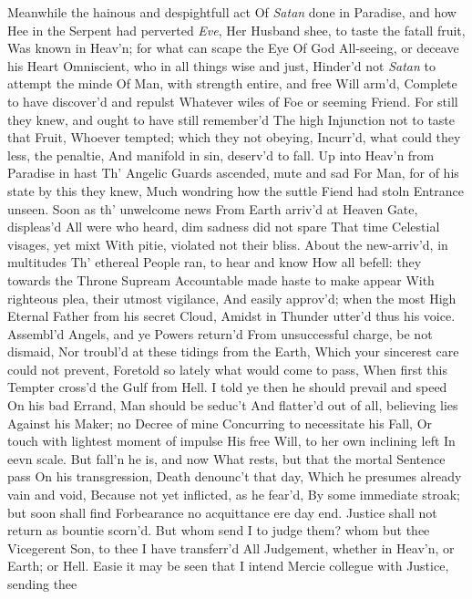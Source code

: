 \documentclass[11pt]{book}
\newcounter {first}
\begin{document}
\quad Meanwhile the hainous and despightfull act 
Of \textit{Satan} done in Paradise, and how 
Hee in the Serpent had perverted \textit{Eve}, 
Her Husband shee, to taste the fatall fruit, 
Was known in Heav'n; for what can scape the Eye 
Of God All-seeing, or deceave his Heart 
Omniscient, who in all things wise and just, 
Hinder'd not \textit{Satan} to attempt the minde 
Of Man, with strength entire, and free Will arm'd, 
Complete to have discover'd and repulst 
Whatever wiles of Foe or seeming Friend. 
For still they knew, and ought to have still remember'd 
The high Injunction not to taste that Fruit, 
Whoever tempted; which they not obeying, 
Incurr'd, what could they less, the penaltie, 
And manifold in sin, deserv'd to fall. 
Up into Heav'n from Paradise in hast 
Th' Angelic Guards ascended, mute and sad 
For Man, for of his state by this they knew, 
Much wondring how the suttle Fiend had stoln 
Entrance unseen.  Soon as th' unwelcome news 
From Earth arriv'd at Heaven Gate, displeas'd 
All were who heard, dim sadness did not spare 
That time Celestial visages, yet mixt 
With pitie, violated not their bliss. 
About the new-arriv'd, in multitudes 
Th' ethereal People ran, to hear and know 
How all befell: they towards the Throne Supream 
Accountable made haste to make appear 
With righteous plea, their utmost vigilance, 
And easily approv'd; when the most High 
Eternal Father from his secret Cloud, 
Amidst in Thunder utter'd thus his voice. 
\quad Assembl'd Angels, and ye Powers return'd 
From unsuccessful charge, be not dismaid, 
Nor troubl'd at these tidings from the Earth, 
Which your sincerest care could not prevent, 
Foretold so lately what would come to pass, 
When first this Tempter cross'd the Gulf from Hell. 
I told ye then he should prevail and speed 
On his bad Errand, Man should be seduc't 
And flatter'd out of all, believing lies 
Against his Maker; no Decree of mine 
Concurring to necessitate his Fall, 
Or touch with lightest moment of impulse 
His free Will, to her own inclining left 
In eevn scale.  But fall'n he is, and now 
What rests, but that the mortal Sentence pass 
On his transgression, Death denounc't that day, 
Which he presumes already vain and void, 
Because not yet inflicted, as he fear'd, 
By some immediate stroak; but soon shall find 
Forbearance no acquittance ere day end. 
Justice shall not return as bountie scorn'd. 
But whom send I to judge them? whom but thee 
Vicegerent Son, to thee I have transferr'd 
All Judgement, whether in Heav'n, or Earth; or Hell. 
Easie it may be seen that I intend 
Mercie collegue with Justice, sending thee 
\end{document}

